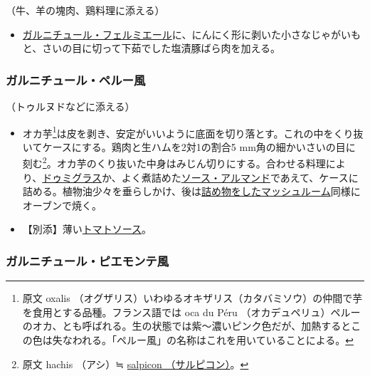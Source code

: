 \begin{recette}
（牛、羊の塊肉、鶏料理に添える）

\begin{itemize}
\tightlist
\item
  \protect\hyperlink{garniture-fermiere}{ガルニチュール・フェルミエール}に、にんにく形に剥いた小さなじゃがいもと、さいの目に切って下茹でした塩漬豚ばら肉を加える。
\end{itemize}

\atoaki{}

\hypertarget{garniture-peruvienne}{%
\subsubsection{ガルニチュール・ペルー風}\label{garniture-peruvienne}}



（トゥルヌドなどに添える）

\begin{itemize}
\item
  オカ芋\footnote{原文 oxalis
    （オグザリス）いわゆるオキザリス（カタバミソウ）の仲間で芋を食用とする品種。フランス語では
    oca du Péru
    （オカデュペリュ）ペルーのオカ、とも呼ばれる。生の状態では紫〜濃いピンク色だが、加熱するとこの色は失なわれる。「ペルー風」の名称はこれを用いていることによる。}は皮を剥き、安定がいいように底面を切り落とす。これの中をくり抜いてケースにする。鶏肉と生ハムを2対1の割合5
  mm角の細かいさいの目に刻む\footnote{原文 hachis （アシ）≒
    \protect\hyperlink{salpicons-divers}{salpicon （サルピコン）}。}。オカ芋のくり抜いた中身はみじん切りにする。合わせる料理により、\protect\hyperlink{sauce-demi-glace}{ドゥミグラス}か、よく煮詰めた\protect\hyperlink{sauce-allemande}{ソース・アルマンド}であえて、ケースに詰める。植物油少々を垂らしかけ、後は\protect\hyperlink{champignons-farcis}{詰め物をしたマッシュルーム}同様にオーブンで焼く。
\item
  【別添】薄い\protect\hyperlink{sauce-tomate}{トマトソース}。
\end{itemize}

\atoaki{}

\hypertarget{garniture-piemontaise}{%
\subsubsection{ガルニチュール・ピエモンテ風}\label{garniture-piemontaise}}


\end{recette}
